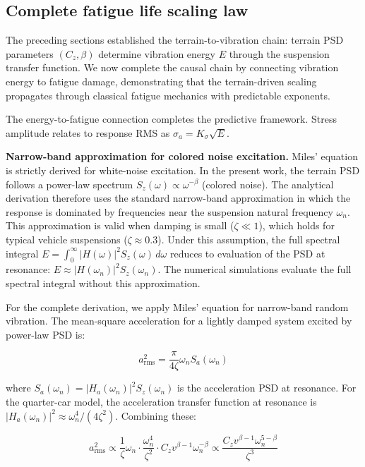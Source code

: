 \documentclass[11pt]{article}
\begin{document}
\subsection*{Complete fatigue life scaling law}

The preceding sections established the terrain-to-vibration chain: terrain PSD parameters $(C_z, \beta)$ determine vibration energy $E$ through the suspension transfer function. We now complete the causal chain by connecting vibration energy to fatigue damage, demonstrating that the terrain-driven scaling propagates through classical fatigue mechanics with predictable exponents.

The energy-to-fatigue connection completes the predictive framework. Stress amplitude relates to response RMS as $\sigma_a = K_\sigma \sqrt{E}$\cite{Dowling2013,Lutes2004}. 

\textbf{Narrow-band approximation for colored noise excitation.} Miles' equation\cite{Miles1954} is strictly derived for white-noise excitation. In the present work, the terrain PSD follows a power-law spectrum $S_z(\omega) \propto \omega^{-\beta}$ (colored noise). The analytical derivation therefore uses the standard narrow-band approximation in which the response is dominated by frequencies near the suspension natural frequency $\omega_n$. This approximation is valid when damping is small ($\zeta \ll 1$), which holds for typical vehicle suspensions ($\zeta \approx 0.3$). Under this assumption, the full spectral integral $E = \int_0^\infty |H(\omega)|^2 S_z(\omega)\, d\omega$ reduces to evaluation of the PSD at resonance: $E \approx |H(\omega_n)|^2 S_z(\omega_n)$. The numerical simulations evaluate the full spectral integral without this approximation.

For the complete derivation, we apply Miles' equation for narrow-band random vibration. The mean-square acceleration for a lightly damped system excited by power-law PSD is:

\begin{equation}
a_{\text{rms}}^2 = \frac{\pi}{4\zeta} \omega_n S_a(\omega_n)
\end{equation}

where $S_a(\omega_n) = |H_a(\omega_n)|^2 S_z(\omega_n)$ is the acceleration PSD at resonance. For the quarter-car model, the acceleration transfer function at resonance is $|H_a(\omega_n)|^2 \approx \omega_n^4/(4\zeta^2)$. Combining these:

\begin{equation}
a_{\text{rms}}^2 \propto \frac{1}{\zeta} \omega_n \cdot \frac{\omega_n^4}{\zeta^2} \cdot C_z v^{\beta-1} \omega_n^{-\beta} \propto \frac{C_z v^{\beta-1} \omega_n^{5-\beta}}{\zeta^3}
\end{equation}
\end{document}
